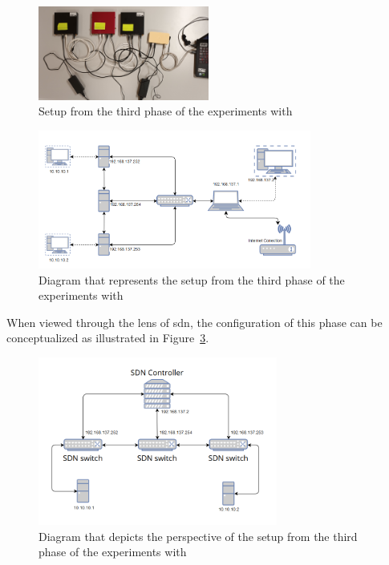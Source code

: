 \begin{figure}
	\centering
	\includegraphics[width=0.5\textwidth]{Chapters/Figures/tests/ovs_phase_3/setup.jpg}
	\caption{Setup from the third phase of the experiments with }
	\label{fig:exp1_phase3_setup}
\end{figure}

\begin{figure}
	\centering
	\includegraphics[width=0.8\textwidth]{Chapters/Figures/tests/ovs_phase_4/setup_diagram.PNG}
	\caption{Diagram that represents the setup from the third phase of the experiments with }
	\label{fig:exp1_phase4_diagram}
\end{figure}


When viewed through the lens of \gls{sdn}, the configuration of this phase can be conceptualized as illustrated in Figure~\ref{fig:exp1_phase4_sdn_diagram}.

\begin{figure}
	\centering
	\includegraphics[width=0.7\textwidth]{Chapters/Figures/tests/ovs_phase_4/sdn_diagram.PNG}
	\caption{Diagram that depicts the  perspective of the setup from the third phase of the experiments with }
	\label{fig:exp1_phase4_sdn_diagram}
\end{figure}



